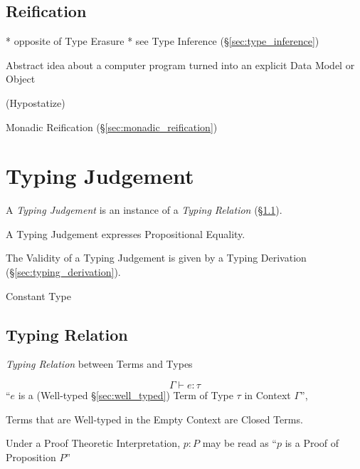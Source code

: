 \subsection{Reification}\label{sec:reification}

* opposite of Type Erasure
* see Type Inference (\S\ref{sec:type_inference})

Abstract idea about a computer program turned into an explicit Data
Model or Object

(Hypostatize) %

Monadic Reification (\S\ref{sec:monadic_reification})



\section{Typing Judgement}\label{sec:typing_judgement}

A \emph{Typing Judgement} is an instance of a \emph{Typing Relation}
(\S\ref{sec:typing_relation}).

A Typing Judgement expresses Propositional Equality. %

The Validity of a Typing Judgement is given by a Typing Derivation
(\S\ref{sec:typing_derivation}).

Constant Type %



\subsection{Typing Relation}\label{sec:typing_relation}

\emph{Typing Relation} between Terms and Types

\[
  \Gamma \vdash e : \tau
\]
``$e$ is a (Well-typed \S\ref{sec:well_typed}) Term of Type $\tau$ in
Context $\Gamma$'',

Terms that are Well-typed in the Empty Context are Closed Terms.

Under a Proof Theoretic Interpretation, $p : P$ may be read as ``$p$
is a Proof of Proposition $P$''



